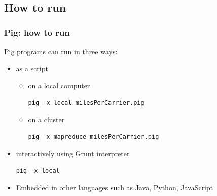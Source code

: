 \documentclass{beamer}
\begin{document}
\subsection{How to run}
\begin{frame}[fragile]
 \frametitle{Pig: how to run}
 Pig programs can run in three ways: 
 \begin{itemize}
   \item as a script
     \begin{itemize} 
     \item on a local computer
{\color{mycolorcli}
       \begin{lstlisting}[frame=no, basicstyle=\tiny]
         pig -x local milesPerCarrier.pig
       \end{lstlisting}
}
     \item on a cluster
{\color{mycolorcli}
       \begin{lstlisting}[frame=no, basicstyle=\tiny]
         pig -x mapreduce milesPerCarrier.pig
       \end{lstlisting}
}       
     \end{itemize}
   \item interactively using Grunt interpreter
{\color{mycolorcli}
       \begin{lstlisting}[frame=no, basicstyle=\tiny]
         pig -x local
       \end{lstlisting}
}            
   \item Embedded in other languages such as Java, Python, JavaScript
 \end{itemize}
\end{frame}
\end{document}
